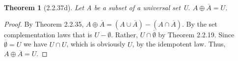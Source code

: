 \documentclass[a4paper, 12pt]{article}
\theoremstyle{plain}
\newtheorem*{theorem*}{Theorem}
\begin{document}
	
	\begin{theorem*}[2.2.37d]
		Let A be a subset of a universal set U. $A \oplus \overline{A} = U$.
	\end{theorem*}
	
	\begin{proof}
		By Theorem 2.2.35, $A \oplus \overline{A} = (A \cup \overline{A}) - (A \cap \overline{A})$. 
		By the set complementation laws that is $U - \emptyset$. Rather, 
		$U \cap \overline{\emptyset}$ by Theorem 2.2.19. Since $\overline{\emptyset} = U$ we have 
		$U \cap U$, which is obviously $U$, by the idempotent law. Thus, 
		$A \oplus \overline{A} = U$.
	\end{proof}
\end{document}

